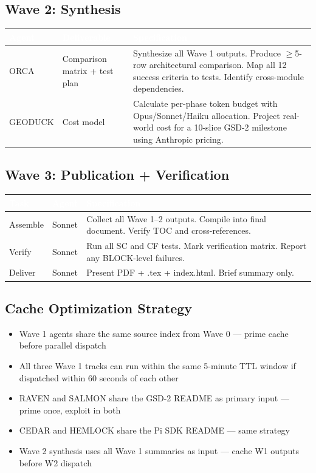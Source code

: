 \documentclass[11pt,letterpaper]{article}
\newcommand{\tableheader}[1]{\textbf{\sffamily\textcolor{white}{#1}}}
\begin{document}
\subsection{Wave 2: Synthesis}

\begin{center}
\begin{tabularx}{\textwidth}{L{2.5cm}L{3cm}X}
\toprule
{}
\tableheader{Agent} & \tableheader{Deliverable} & \tableheader{Specification} \\
\midrule
ORCA & Comparison matrix + test plan & Synthesize all Wave 1 outputs. Produce $\geq$5-row architectural comparison. Map all 12 success criteria to tests. Identify cross-module dependencies. \\
GEODUCK & Cost model & Calculate per-phase token budget with Opus/Sonnet/Haiku allocation. Project real-world cost for a 10-slice GSD-2 milestone using Anthropic pricing. \\
\bottomrule
\end{tabularx}
\end{center}

\subsection{Wave 3: Publication + Verification}

\begin{center}
\begin{tabularx}{\textwidth}{L{2.5cm}L{3cm}X}
\toprule
{}
\tableheader{Task} & \tableheader{Agent} & \tableheader{Specification} \\
\midrule
Assemble & Sonnet & Collect all Wave 1--2 outputs. Compile into final document. Verify TOC and cross-references. \\
Verify & Sonnet & Run all SC and CF tests. Mark verification matrix. Report any BLOCK-level failures. \\
Deliver & Sonnet & Present PDF + .tex + index.html. Brief summary only. \\
\bottomrule
\end{tabularx}
\end{center}

\subsection{Cache Optimization Strategy}

\begin{itemize}
  \item Wave 1 agents share the same source index from Wave 0 --- prime cache before parallel dispatch
  \item All three Wave 1 tracks can run within the same 5-minute TTL window if dispatched within 60 seconds of each other
  \item RAVEN and SALMON share the GSD-2 README as primary input --- prime once, exploit in both
  \item CEDAR and HEMLOCK share the Pi SDK README --- same strategy
  \item Wave 2 synthesis uses all Wave 1 summaries as input --- cache W1 outputs before W2 dispatch
\end{itemize}
\end{document}
